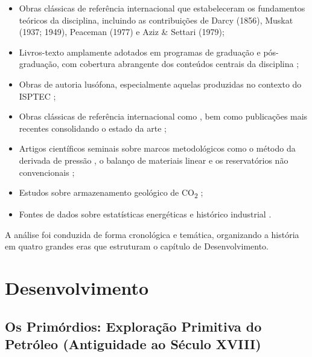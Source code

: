\documentclass[
  12pt,
  a4paper,
  oneside,
  brazilian,
  sumario=tradicional
]{abntex2}
\begin{document}
\begin{itemize}
  \item Obras clássicas de referência internacional que estabeleceram
    os fundamentos teóricos da disciplina, incluindo as contribuições
    de Darcy (1856), Muskat (1937; 1949), Peaceman (1977) e Aziz \&
    Settari (1979);
  \item Livros-texto amplamente adotados em programas de graduação e
    pós-graduação, com cobertura abrangente dos conteúdos centrais da
    disciplina \cite{rosa2006, dake2014, mccain1990, ahmed2010,
    terry2015, alyafei2019};
  \item Obras de autoria lusófona, especialmente aquelas produzidas
    no contexto do ISPTEC \cite{ramos2016, ramos2020};
  \item Obras clássicas de referência internacional como \cite{craft1991,
    dake1994}, bem como publicações mais recentes consolidando o estado
    da arte \cite{mungan2019, spe2015};
  \item Artigos científicos seminais sobre marcos metodológicos como
    o método da derivada de pressão \cite{bourdet1989}, o balanço de
    materiais linear \cite{havlena1963} e os reservatórios não
    convencionais \cite{javadpour2009};
  \item Estudos sobre armazenamento geológico de CO\textsubscript{2}
    \cite{bachu2000};
  \item Fontes de dados sobre estatísticas energéticas e histórico industrial
    \cite{bp2023, eia2023, wikipediaReservoirEngineering, wikipediaPetroleumHistory}.
\end{itemize}

A análise foi conduzida de forma cronológica e temática, organizando
a história em quatro grandes eras que estruturam o capítulo de
Desenvolvimento.

\chapter{Desenvolvimento}
\label{chap:desenvolvimento}

\section{Os Primórdios: Exploração Primitiva do Petróleo (Antiguidade ao Século XVIII)}
\label{sec:antiguidade}
\end{document}
